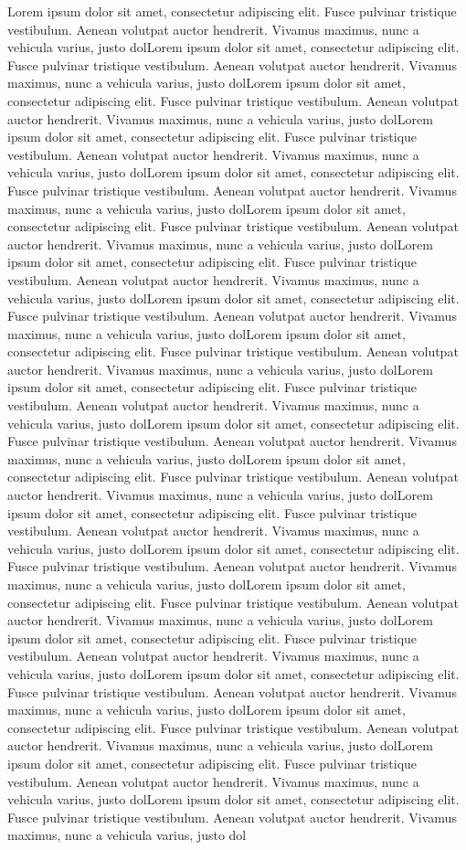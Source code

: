 Lorem ipsum dolor sit amet, consectetur adipiscing elit. Fusce pulvinar tristique vestibulum. Aenean volutpat auctor hendrerit. Vivamus maximus, nunc a vehicula varius, justo dolLorem ipsum dolor sit amet, consectetur adipiscing elit. Fusce pulvinar tristique vestibulum. Aenean volutpat auctor hendrerit. Vivamus maximus, nunc a vehicula varius, justo dolLorem ipsum dolor sit amet, consectetur adipiscing elit. Fusce pulvinar tristique vestibulum. Aenean volutpat auctor hendrerit. Vivamus maximus, nunc a vehicula varius, justo dolLorem ipsum dolor sit amet, consectetur adipiscing elit. Fusce pulvinar tristique vestibulum. Aenean volutpat auctor hendrerit. Vivamus maximus, nunc a vehicula varius, justo dolLorem ipsum dolor sit amet, consectetur adipiscing elit. Fusce pulvinar tristique vestibulum. Aenean volutpat auctor hendrerit. Vivamus maximus, nunc a vehicula varius, justo dolLorem ipsum dolor sit amet, consectetur adipiscing elit. Fusce pulvinar tristique vestibulum. Aenean volutpat auctor hendrerit. Vivamus maximus, nunc a vehicula varius, justo dolLorem ipsum dolor sit amet, consectetur adipiscing elit. Fusce pulvinar tristique vestibulum. Aenean volutpat auctor hendrerit. Vivamus maximus, nunc a vehicula varius, justo dolLorem ipsum dolor sit amet, consectetur adipiscing elit. Fusce pulvinar tristique vestibulum. Aenean volutpat auctor hendrerit. Vivamus maximus, nunc a vehicula varius, justo dolLorem ipsum dolor sit amet, consectetur adipiscing elit. Fusce pulvinar tristique vestibulum. Aenean volutpat auctor hendrerit. Vivamus maximus, nunc a vehicula varius, justo dolLorem ipsum dolor sit amet, consectetur adipiscing elit. Fusce pulvinar tristique vestibulum. Aenean volutpat auctor hendrerit. Vivamus maximus, nunc a vehicula varius, justo dolLorem ipsum dolor sit amet, consectetur adipiscing elit. Fusce pulvinar tristique vestibulum. Aenean volutpat auctor hendrerit. Vivamus maximus, nunc a vehicula varius, justo dolLorem ipsum dolor sit amet, consectetur adipiscing elit. Fusce pulvinar tristique vestibulum. Aenean volutpat auctor hendrerit. Vivamus maximus, nunc a vehicula varius, justo dolLorem ipsum dolor sit amet, consectetur adipiscing elit. Fusce pulvinar tristique vestibulum. Aenean volutpat auctor hendrerit. Vivamus maximus, nunc a vehicula varius, justo dolLorem ipsum dolor sit amet, consectetur adipiscing elit. Fusce pulvinar tristique vestibulum. Aenean volutpat auctor hendrerit. Vivamus maximus, nunc a vehicula varius, justo dolLorem ipsum dolor sit amet, consectetur adipiscing elit. Fusce pulvinar tristique vestibulum. Aenean volutpat auctor hendrerit. Vivamus maximus, nunc a vehicula varius, justo dolLorem ipsum dolor sit amet, consectetur adipiscing elit. Fusce pulvinar tristique vestibulum. Aenean volutpat auctor hendrerit. Vivamus maximus, nunc a vehicula varius, justo dolLorem ipsum dolor sit amet, consectetur adipiscing elit. Fusce pulvinar tristique vestibulum. Aenean volutpat auctor hendrerit. Vivamus maximus, nunc a vehicula varius, justo dolLorem ipsum dolor sit amet, consectetur adipiscing elit. Fusce pulvinar tristique vestibulum. Aenean volutpat auctor hendrerit. Vivamus maximus, nunc a vehicula varius, justo dolLorem ipsum dolor sit amet, consectetur adipiscing elit. Fusce pulvinar tristique vestibulum. Aenean volutpat auctor hendrerit. Vivamus maximus, nunc a vehicula varius, justo dolLorem ipsum dolor sit amet, consectetur adipiscing elit. Fusce pulvinar tristique vestibulum. Aenean volutpat auctor hendrerit. Vivamus maximus, nunc a vehicula varius, justo dol